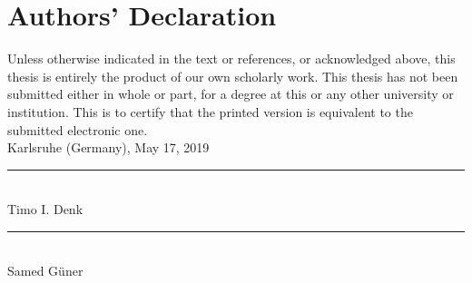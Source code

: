 \section*{Authors' Declaration}\label{sec:authorsdeclaration}
Unless otherwise indicated in the text or references, or acknowledged above, this thesis is entirely the product of our own scholarly work. This thesis has not been submitted either in whole or part, for a degree at this or any other university or institution. This is to certify that the printed version is equivalent to the submitted electronic one.
\vspace{3em}\\
Karlsruhe (Germany), May 17, 2019

\vspace{1em}
\vspace{1.75cm}

\begin{minipage}[t]{.45\textwidth}
    \centering
    \rule{5cm}{0.4pt}\\
    Timo I. Denk
\end{minipage}\hfill%
%
\begin{minipage}[t]{.45\textwidth}
    \centering
    \rule{5cm}{0.4pt}\\
    Samed Güner
\end{minipage}%
\pagebreak
